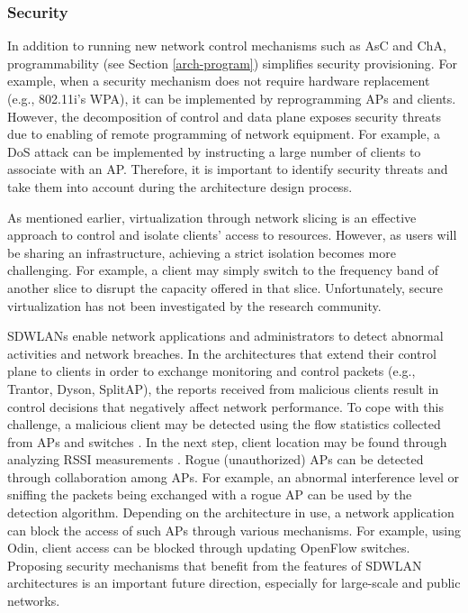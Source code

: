 \subsubsection{\textbf{Security}} 
\label{arch-security}
In addition to running new network control mechanisms such as AsC and ChA, programmability (see Section \ref{arch-program}) simplifies security provisioning.
For example, when a security mechanism does not require hardware replacement (e.g., 802.11i's WPA), it can be implemented by reprogramming APs and clients.
However, the decomposition of control and data plane exposes security threats due to enabling of remote programming of network equipment.
For example, a DoS attack can be implemented by instructing a large number of clients to associate with an AP.
Therefore, it is important to identify security threats and take them into account during the architecture design process.


As mentioned earlier, virtualization through network slicing is an effective approach to control and isolate clients' access to resources.
However, as users will be sharing an infrastructure, achieving a strict isolation becomes more challenging.
For example, a client may simply switch to the frequency band of another slice to disrupt the capacity offered in that slice.
Unfortunately, secure virtualization has not been investigated by the research community.


SDWLANs enable network applications and administrators to detect abnormal activities and network breaches.
In the architectures that extend their control plane to clients in order to exchange monitoring and control packets (e.g., Trantor, Dyson, SplitAP), the reports received from malicious clients result in control decisions that negatively affect network performance.
To cope with this challenge, a malicious client may be detected using the flow statistics collected from APs and switches \cite{OpenSketch}.
In the next step, client location may be found through analyzing RSSI measurements \cite{SpotFi}.
Rogue (unauthorized) APs can be detected through collaboration among APs. 
For example, an abnormal interference level or sniffing the packets being exchanged with a rogue AP can be used by the detection algorithm.
Depending on the architecture in use, a network application can block the access of such APs through various mechanisms.
For example, using Odin, client access can be blocked through updating OpenFlow switches.
Proposing security mechanisms that benefit from the features of SDWLAN architectures is an important future direction, especially for large-scale and public networks.






